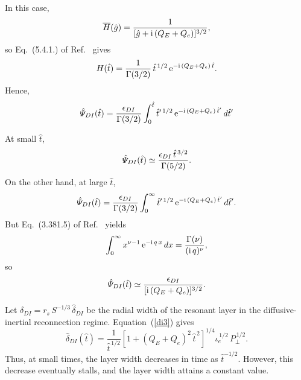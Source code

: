 \documentclass[12pt,prb,aps]{revtex4-1}
\begin{document}
In this case,
\begin{equation}
\overline{H}(\hat{g}) = \frac{1}{[\hat{g}+{\rm i}\,(Q_E+Q_e)]^{3/2}},
\end{equation}
so Eq.~(5.4.1.) of Ref.~  gives
\begin{equation}
H(\hat{t}) = \frac{1}{\Gamma(3/2)}\,\hat{t}^{\,1/2}\,{\rm e}^{-{\rm i}\,(Q_E+Q_e)\,\hat{t}}.
\end{equation}
Hence,
\begin{equation}\label{dip}
\hat{\mit\Psi}_{DI}(\hat{t}) =\frac{\epsilon_{DI}}{\Gamma(3/2)}\int_0^{\hat{t}}
\hat{t}'^{\,1/2}\,{\rm e}^{-{\rm i}\,(Q_E+Q_e)\,\hat{t}'}\,d\hat{t}'
\end{equation}

At small $\hat{t}$,
\begin{equation}\label{dis}
\hat{\mit\Psi}_{DI}(\hat{t}) \simeq \frac{\epsilon_{DI}\,\hat{t}^{\,3/2}}{\Gamma(5/2)}.
\end{equation}
On the other hand, at large $\hat{t}$, 
\begin{equation}
\hat{\mit\Psi}_{DI}(\hat{t}) =\frac{\epsilon_{DI}}{\Gamma(3/2)}\int_0^{\infty}
\hat{t}'^{\,1/2}\,{\rm e}^{-{\rm i}\,(Q_E+Q_e)\,\hat{t}'}\,d\hat{t}'.
\end{equation}
But Eq.~(3.381.5) of Ref.~ yields
\begin{equation}
\int_0^\infty x^{\nu-1}\,{\rm e}^{-{\rm i}\,q\,x}\,dx = \frac{\Gamma(\nu)}{({\rm i}\,q)^{\nu}},
\end{equation}
so 
\begin{equation}\label{dil}
\hat{\mit\Psi}_{DI}(\hat{t}) \simeq \frac{\epsilon_{DI}}{[{\rm i}\,(Q_E+Q_e)]^{3/2}}.
\end{equation}

Let $\delta_{DI} =r_s\,S^{-1/3}\,\hat{\delta}_{DI}$ be the radial width of the resonant layer in the diffusive-inertial reconnection regime. 
Equation~(\ref{di3}) gives 
\begin{equation}
\hat{\delta}_{DI}(\hat{t}) =\frac{1}{\hat{t}^{\,1/2}}\left[1+(Q_E+Q_e)^2\,\hat{t}^{\,2}\right]^{1/4}\iota_e^{\,1/2}\,P_\perp^{\,1/2}.
\end{equation}
Thus, at small times, the layer width decreases in time as $\hat{t}^{-1/2}$. However, this decrease eventually stalls, and the
layer width attains a constant value. 
\end{document}
